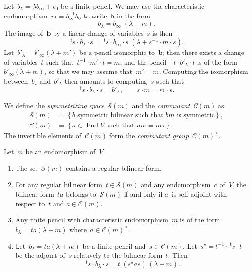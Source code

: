 \documentclass{lms}%
\let\ro\mathscr
\def\transpose{\,{}^{\mathrm{t}\!}}
\def\acco#1{\left\{#1\right\}}
\DeclareMathOperator\End{End}
\begin{document}
\bigskip

Let~$b_{λ} = λ b_{∞} + b_0$ be a finite pencil. We may use the
characteristic endomorphism~$m = b_{∞}^{-1}b_0$ to write~$\bm{b}$ in the form
\begin{equation}\label{eq:adjoint}
b_{λ} = b_{∞}\;(λ + m).
\end{equation}
The image of~$\bm{b}$ by a linear change of variables~$s$ is then
\begin{equation}\label{eq:adjoint-change}
\transpose{s} · b_{λ} · s = 
  \transpose{s} · b_{∞} · s\; ( λ + s^{-1} · m · s).
\end{equation}
Let~$b'_{λ} = b'_{∞} (λ + m')$ be a pencil isomorphic to~$\bm{b}$; then there
exists a change of variables~$t$ such that~$t^{-1} · m' · t = m$, and the
pencil~$\transpose{t} · b'_{λ} · t$ is of the form $b'_{∞} (λ + m)$, so
that we may assume that~$m' = m$. Computing the isomorphism
between~$b_{λ}$ and~$b'_{λ}$ then amounts to computing~$s$ such that
\begin{equation}
\transpose{s} · b_{λ} · s = b'_{λ}, \qquad s · m = m · s.
\end{equation}

We define the \emph{symmetrizing
space}~$\ro S(m)$ and the \emph{commutant}~$\ro C(m)$ as
\begin{equation}\begin{split}
\ro S(m) &= \acco{\text{$b$ symmetric bilinear such that $bm$~is symmetric} },\\
\ro C(m) &= \acco{\text{$a ∈ \End V$ such that~$am = ma$}}.
\end{split}\end{equation}
The invertible elements of~$\ro C(m)$ form the \emph{commutant
group}~$\ro C(m)^{×}$.

\begin{prop}\label{prop:structure-sym}
Let~$m$ be an endomorphism of~$V$.
\begin{enumerate}
\item \label{it:sym-inv} The set~$\ro S(m)$ contains a regular bilinear
form.
\item \label{it:sym-comm} For any regular bilinear form~$t ∈ \ro S(m)$
and any endomorphism~$a$ of~$V$, the bilinear form~$ta$ belongs to~$\ro
S(m)$ if and only if $a$~is self-adjoint with respect to~$t$ and $a ∈ \ro
C(m)$.
\item Any finite pencil with characteristic endomorphism~$m$ is of the
form $b_{λ} = ta (λ+m)$ where~$a ∈ \ro C(m)^{×}$.
\item Let~$b_{λ} = ta(λ+m)$ be a finite pencil and~$s ∈ \ro C(m)$.
Let~$s^{⋆} = t^{-1} · \transpose{s} · t$ be the adjoint of~$s$
relatively to the bilinear form~$t$. Then
\begin{equation}
\transpose{s} · b_{λ} · s = t\: (s^{⋆} a s)\: (λ + m).
\end{equation}
\end{enumerate}
\end{prop}
\end{document}
